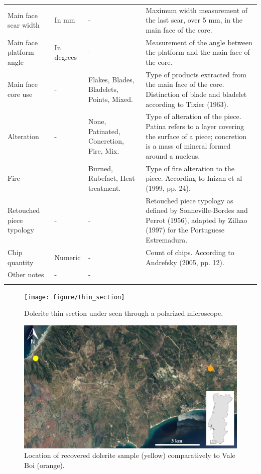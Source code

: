 \documentclass[12pt,twoside]{reedthesis}
\begin{document}
\begin{landscape}
\begin{longtable}[t]{>{\raggedright\arraybackslash}p{2cm}>{\raggedright\arraybackslash}p{3cm}>{\raggedright\arraybackslash}p{6cm}>{\raggedright\arraybackslash}p{9cm}}
Main face scar width & In mm & - & Maximum width measurement of the last scar, over 5 mm, in the main face of the core.\\
Main face platform angle & In degrees & - & Measurement of the angle between the platform and the main face of the core.\\
\addlinespace
Main face core use & - & Flakes, Blades, Bladelets, Points, Mixed. & Type of products extracted from the main face of the core. Distinction of blade and bladelet according to Tixier (1963).\\
Alteration & - & None, Patinated, Concretion, Fire, Mix. & Type of alteration of the piece. Patina refers to a layer covering the surface of a piece; concretion is a mass of mineral formed around a nucleus.\\
Fire & - & Burned, Rubefact, Heat treatment. & Type of fire alteration to the piece. According to Inizan et al (1999, pp. 24).\\
Retouched piece typology & - & - & Retouched piece typology as defined by Sonneville-Bordes and Perrot (1956), adapted by Zilhao (1997) for the Portuguese Estremadura.\\
Chip quantity & Numeric & - & Count of chips. According to Andrefsky (2005, pp. 12).\\
\addlinespace
Other notes & - & - & \\*
\end{longtable}
\end{landscape}
\begin{figure}
\texttt{[image: figure/thin\_section]} \caption{Dolerite thin section under seen through a polarized microscope.}\label{fig:unnamed-chunk-56}
\end{figure}
\begin{figure}
\includegraphics[width=1\linewidth]{figure/dolerite_sample} \caption{Location of recovered dolerite sample (yellow) comparatively to Vale Boi (orange).}\label{fig:unnamed-chunk-57}
\end{figure}
\end{document}
